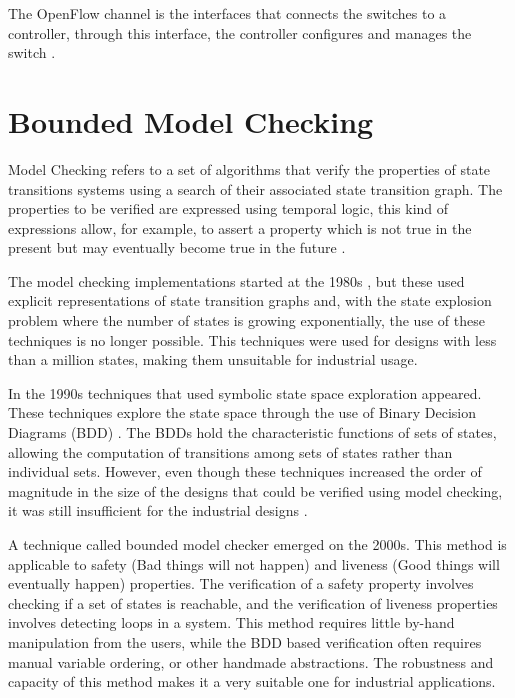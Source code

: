 The OpenFlow channel is the interfaces that connects the switches to a controller, through this interface, the controller configures and manages the switch \cite{openflow2011openflow}.



\section{Bounded Model Checking}
%

Model Checking refers to a set of algorithms that verify the properties of state transitions systems using a search of their associated state transition graph. The properties to be verified are expressed using temporal logic, this kind of expressions allow, for example, to assert a property which is not true in the present but may eventually become true in the future \cite{clarke2001bounded}.

The model checking implementations started at the 1980s \cite{clarke1986automatic}, but these used explicit representations of state transition graphs and, with the state explosion problem where the number of states is growing exponentially, the use of these techniques is no longer possible. This techniques were used for designs with less than a million states, making them unsuitable for industrial usage. 

In the 1990s techniques that used symbolic state space exploration appeared. These techniques explore the state space through the use of Binary Decision Diagrams (BDD) \cite{burch1992symbolic}. The BDDs hold the characteristic functions of sets of states, allowing the computation of transitions among sets of states rather than individual sets. However, even though these techniques increased the order of magnitude in the size of the designs that could be verified using model checking, it was still insufficient for the industrial designs \cite{clarke2001bounded}.

A technique called bounded model checker emerged on the 2000s. This method is applicable to safety (Bad things will not happen) and liveness (Good things will eventually happen) properties. The verification of a safety property involves checking if a set of states is reachable, and the verification of liveness properties involves detecting loops in a system. This method requires little by-hand manipulation from the users, while the BDD based verification often requires manual variable ordering, or other handmade abstractions. The robustness and capacity of this method makes it a very suitable one for industrial applications.

